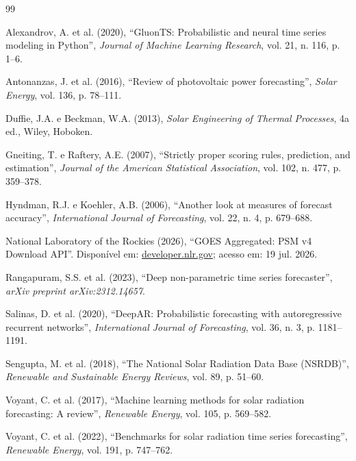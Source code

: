 \documentclass[12pt,a4paper,fleqn]{article}
\begin{document}
\begin{thebibliography}{99}

Alexandrov, A. et al. (2020), ``GluonTS: Probabilistic and neural time series modeling in Python'', \textit{Journal of Machine Learning Research}, vol. 21, n. 116, p. 1--6.

Antonanzas, J. et al. (2016), ``Review of photovoltaic power forecasting'', \textit{Solar Energy}, vol. 136, p. 78--111.

Duffie, J.A. e Beckman, W.A. (2013), \textit{Solar Engineering of Thermal Processes}, 4a ed., Wiley, Hoboken.

Gneiting, T. e Raftery, A.E. (2007), ``Strictly proper scoring rules, prediction, and estimation'', \textit{Journal of the American Statistical Association}, vol. 102, n. 477, p. 359--378.

Hyndman, R.J. e Koehler, A.B. (2006), ``Another look at measures of forecast accuracy'', \textit{International Journal of Forecasting}, vol. 22, n. 4, p. 679--688.

National Laboratory of the Rockies (2026), ``GOES Aggregated: PSM v4 Download API''. Disponível em: \href{https://developer.nlr.gov/docs/solar/nsrdb/nsrdb-GOES-aggregated-v4-0-0-download/}{developer.nlr.gov}; acesso em: 19 jul. 2026.

Rangapuram, S.S. et al. (2023), ``Deep non-parametric time series forecaster'', \textit{arXiv preprint arXiv:2312.14657}.

Salinas, D. et al. (2020), ``DeepAR: Probabilistic forecasting with autoregressive recurrent networks'', \textit{International Journal of Forecasting}, vol. 36, n. 3, p. 1181--1191.

Sengupta, M. et al. (2018), ``The National Solar Radiation Data Base (NSRDB)'', \textit{Renewable and Sustainable Energy Reviews}, vol. 89, p. 51--60.

Voyant, C. et al. (2017), ``Machine learning methods for solar radiation forecasting: A review'', \textit{Renewable Energy}, vol. 105, p. 569--582.

Voyant, C. et al. (2022), ``Benchmarks for solar radiation time series forecasting'', \textit{Renewable Energy}, vol. 191, p. 747--762.

\end{thebibliography}
\end{document}
